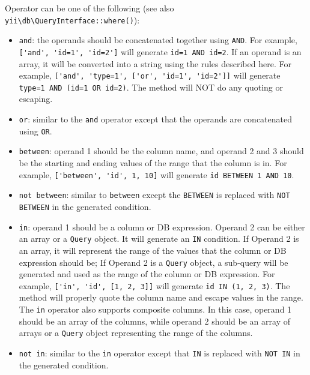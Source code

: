 Operator can be one of the following (see also \texttt{yii{\allowbreak{}\textbackslash}db{\allowbreak{}\textbackslash}QueryInterface\allowbreak{}::\allowbreak{}where()}):

\begin{itemize}
\item \lstinline|and|: the operands should be concatenated together using \lstinline|AND|. For example,
\lstinline|['and', 'id=1', 'id=2']| will generate \lstinline|id=1 AND id=2|. If an operand is an array,
it will be converted into a string using the rules described here. For example,
\lstinline|['and', 'type=1', ['or', 'id=1', 'id=2']]| will generate \lstinline|type=1 AND (id=1 OR id=2)|.
The method will NOT do any quoting or escaping.


\item \lstinline|or|: similar to the \lstinline|and| operator except that the operands are concatenated using \lstinline|OR|.


\item \lstinline|between|: operand 1 should be the column name, and operand 2 and 3 should be the
 starting and ending values of the range that the column is in.
 For example, \lstinline|['between', 'id', 1, 10]| will generate \lstinline|id BETWEEN 1 AND 10|.


\item \lstinline|not between|: similar to \lstinline|between| except the \lstinline|BETWEEN| is replaced with \lstinline|NOT BETWEEN|
in the generated condition.


\item \lstinline|in|: operand 1 should be a column or DB expression. Operand 2 can be either an array or a \lstinline|Query| object.
It will generate an \lstinline|IN| condition. If Operand 2 is an array, it will represent the range of the values
that the column or DB expression should be; If Operand 2 is a \lstinline|Query| object, a sub-query will be generated
and used as the range of the column or DB expression. For example,
\lstinline|['in', 'id', [1, 2, 3]]| will generate \lstinline|id IN (1, 2, 3)|.
The method will properly quote the column name and escape values in the range.
The \lstinline|in| operator also supports composite columns. In this case, operand 1 should be an array of the columns,
while operand 2 should be an array of arrays or a \lstinline|Query| object representing the range of the columns.


\item \lstinline|not in|: similar to the \lstinline|in| operator except that \lstinline|IN| is replaced with \lstinline|NOT IN| in the generated condition.



\end{itemize}
